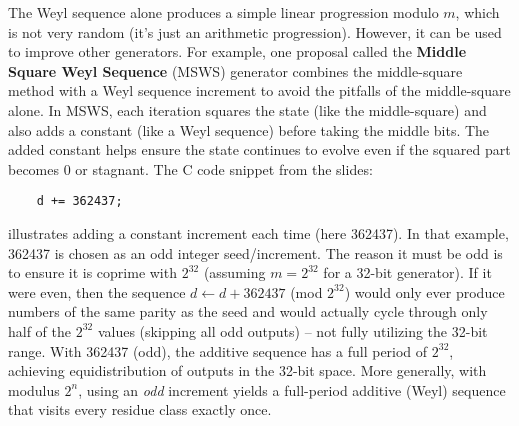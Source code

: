 \documentclass[11pt]{article}
\begin{document}
The Weyl sequence alone produces a simple linear progression modulo $m$, which is not very random (it’s just an arithmetic progression). However, it can be used to improve other generators. For example, one proposal called the \textbf{Middle Square Weyl Sequence} (MSWS) generator combines the middle-square method with a Weyl sequence increment to avoid the pitfalls of the middle-square alone. In MSWS, each iteration squares the state (like the middle-square) and also adds a constant (like a Weyl sequence) before taking the middle bits. The added constant helps ensure the state continues to evolve even if the squared part becomes 0 or stagnant. The C code snippet from the slides:
\begin{verbatim}
    d += 362437;
\end{verbatim}
illustrates adding a constant increment each time (here 362437). In that example, 362437 is chosen as an odd integer seed/increment. The reason it must be odd is to ensure it is coprime with $2^{32}$ (assuming $m=2^{32}$ for a 32-bit generator). If it were even, then the sequence $d \leftarrow d + 362437$ (mod $2^{32}$) would only ever produce numbers of the same parity as the seed and would actually cycle through only half of the $2^{32}$ values (skipping all odd outputs) – not fully utilizing the 32-bit range. With 362437 (odd), the additive sequence has a full period of $2^{32}$, achieving equidistribution of outputs in the 32-bit space. More generally, with modulus $2^n$, using an \emph{odd} increment yields a full-period additive (Weyl) sequence that visits every residue class exactly once.
\end{document}
